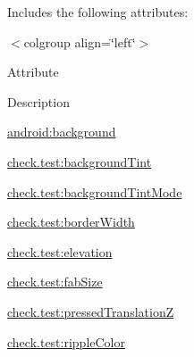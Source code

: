 Includes the following attributes\+:

\begin{TabularC}{0}
\hline
\end{TabularC}
$<$colgroup align=\char`\"{}left\char`\"{}$>$ 

Attribute

Description 

{\ttfamily \hyperlink{classcheck_1_1test_1_1_r_1_1styleable_a72ad03dd3abdff80960d8174b01e6c87}{android\+:background}}

{\ttfamily \hyperlink{classcheck_1_1test_1_1_r_1_1styleable_a1f3f7c01b4b7fd997c371ce60234abad}{check.\+test\+:background\+Tint}}

{\ttfamily \hyperlink{classcheck_1_1test_1_1_r_1_1styleable_a9a94417aa77b157ee8ca3ac5e289b662}{check.\+test\+:background\+Tint\+Mode}}

{\ttfamily \hyperlink{classcheck_1_1test_1_1_r_1_1styleable_a170afde9a336204ba95ce5648ffd3a65}{check.\+test\+:border\+Width}}

{\ttfamily \hyperlink{classcheck_1_1test_1_1_r_1_1styleable_af996a59bf7a9501bc11bbb4a5451900e}{check.\+test\+:elevation}}

{\ttfamily \hyperlink{classcheck_1_1test_1_1_r_1_1styleable_a9f7ddd112d179b839c66772f44baf8fc}{check.\+test\+:fab\+Size}}

{\ttfamily \hyperlink{classcheck_1_1test_1_1_r_1_1styleable_ae7c3b194d0b7e221bd1700bb86de5567}{check.\+test\+:pressed\+Translation\+Z}}

{\ttfamily \hyperlink{classcheck_1_1test_1_1_r_1_1styleable_a59b8eecd772872da56ad0f0984dee569}{check.\+test\+:ripple\+Color}}

